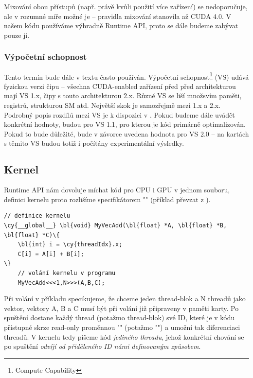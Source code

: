     Mixování obou přístupů (např. právě kvůli použití více zařízení) se nedoporučuje, ale v rozumné míře možné je -- pravidla mixování stanovila až CUDA 4.0. V našem kódu používáme výhradně Runtime API, proto se dále budeme zabývat pouze jí.

    \subsubsection{Výpočetní schopnost}

    Tento termín bude dále v textu často používán. Výpočetní schopnost\footnote{Compute Capability} (VS) udává fyzickou verzi čipu -- všechna CUDA-enabled zařízení před před architekturou \FERMI mají VS 1.x, čipy s touto architekturou 2.x. Různé VS se liší množsvím paměti, registrů, strukturou SM atd. Největší skok je samozřejmě mezi 1.x a 2.x. Podrobný popis rozdílů mezi VS je k dispozici v \cite[přílohy]{CUDA programming g.}. Pokud budeme dále uvádět konkrétní hodnoty, budou pro VS 1.1, pro kterou je kód primárně optimalizován. Pokud to bude důležité, bude v závorce uvedena hodnota pro VS 2.0 -- na kartách s těmito VS budou totiž i počítány experimentální výsledky.

    \subsection{Kernel}

    Runtime API nám dovoluje míchat kód pro CPU i GPU v jednom souboru, definici kernelu proto rozlišíme specifikátorem
    \Vr"" (příklad převzat z \cite{CUDA programming g.}).

    \begin{Verbatim}[commandchars = \\\{\}]
    // definice kernelu
\cy{__global__} \bl{void} MyVecAdd(\bl{float} *A, \bl{float} *B, \bl{float} *C)\{
    \bl{int} i = \cy{threadIdx}.x;
    C[i] = A[i] + B[i];
\}
    // volání kernelu v programu
    MyVecAdd<<<1,N>>>(A,B,C);
    \end{Verbatim}

    Při volání v příkladu specikujeme, že chceme jeden thread-blok a N threadů jako vektor, vektory A, B a C musí být při volání již připraveny v paměti karty. Po spuštění dostane každý thread (potažmo thread-blok) své ID, které je v kódu přístupné skrze read-only proměnnou \Vr"" (potažmo \Vr"") a umožní tak diferenciaci threadů. V kernelu tedy píšeme kód \emph{jediného threadu}, jehož konkrétní chování se po spuštění \emph{odvíjí od přiděleného ID námi definovaným způsobem}.

